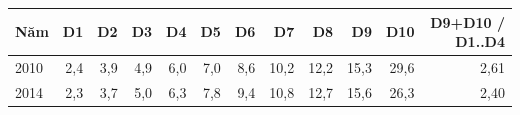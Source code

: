 \begin{tabular}{lrrrrrrrrrrr}
\toprule
Năm & D1 & D2 & D3 & D4 & D5 & D6 & D7 & D8 & D9 & D10 & D9+D10 / D1..D4 \\
\midrule
2010 & 2,4 & 3,9 & 4,9 & 6,0 & 7,0 & 8,6 & 10,2 & 12,2 & 15,3 & 29,6 & 2,61 \\
2014 & 2,3 & 3,7 & 5,0 & 6,3 & 7,8 & 9,4 & 10,8 & 12,7 & 15,6 & 26,3 & 2,40 \\
\bottomrule
\end{tabular}
